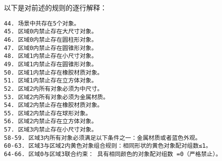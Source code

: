 以下是对前述的规则的逐行解释：
\begin{lstlisting}
44. 场景中共存在5个对象。
45. 区域0内禁止存在大尺寸对象。
46. 区域0内禁止存在圆柱形对象。
47. 区域0内禁止存在圆锥形对象。
48. 区域1内禁止存在小尺寸对象。
49. 区域1内禁止存在圆锥形对象。
50. 区域1内禁止存在橡胶材质对象。
51. 区域1内禁止存在立方体对象。
52. 区域2内所有对象必须为中尺寸。
53. 区域2内所有对象必须为金属材质。
54. 区域2内禁止存在橡胶材质对象。
55. 区域2内禁止存在球形对象。
56. 区域2内禁止存在立方体对象。
57. 区域3内禁止存在小尺寸对象。
58-59. 区域3内所有对象必须满足以下条件之一：金属材质或者蓝色外观。
60-63. 区域3与区域2内黄色对象组合规则：相同形状的黄色对象配对组数≤1。
64-66. 区域0与区域3联合约束： 具有相同颜色的对象配对组数 =0（严格禁止）。
\end{lstlisting}